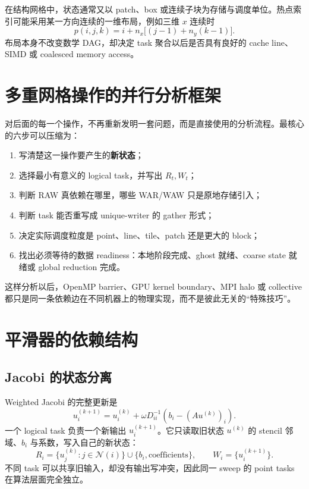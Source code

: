 在结构网格中，状态通常又以 patch、box 或连续子块为存储与调度单位。热点索引可能采用某一方向连续的一维布局，例如三维 $x$ 连续时
\begin{equation}
p(i,j,k)=i+n_x\bigl[(j-1)+n_y(k-1)\bigr].
\end{equation}
布局本身不改变数学 DAG，却决定 task 聚合以后是否具有良好的 cache line、SIMD 或 coalesced memory access。

\section{多重网格操作的并行分析框架}

对后面的每一个操作，不再重新发明一套问题，而是直接使用的分析流程。最核心的六步可以压缩为：

\begin{enumerate}
\item 写清楚这一操作要产生的\textbf{新状态}；
\item 选择最小有意义的 logical task，并写出 $R_t,W_t$；
\item 判断 RAW 真依赖在哪里，哪些 WAR/WAW 只是原地存储引入；
\item 判断 task 能否重写成 unique-writer 的 gather 形式；
\item 决定实际调度粒度是 point、line、tile、patch 还是更大的 block；
\item 找出必须等待的数据 readiness：本地阶段完成、ghost 就绪、coarse state 就绪或 global reduction 完成。
\end{enumerate}

这样分析以后，OpenMP barrier、GPU kernel boundary、MPI halo 或 collective 都只是同一条依赖边在不同机器上的物理实现，而不是彼此无关的“特殊技巧”。

\section{平滑器的依赖结构}

\subsection{Jacobi 的状态分离}

Weighted Jacobi 的完整更新是
\begin{equation}
u_i^{(k+1)}
=
u_i^{(k)}
+
\omega D_{ii}^{-1}
\left(
b_i-(Au^{(k)})_i
\right).
\label{eq:mg-parallel-jacobi-full}
\end{equation}
一个 logical task 负责一个新输出 $u_i^{(k+1)}$。它只读取旧状态 $u^{(k)}$ 的 stencil 邻域、$b_i$ 与系数，写入自己的新状态：
\begin{equation}
R_i=
\{u_j^{(k)}:j\in\mathcal N(i)\}
\cup
\{b_i,\text{coefficients}\},
\qquad
W_i=\{u_i^{(k+1)}\}.
\label{eq:mg-jacobi-rw}
\end{equation}
不同 task 可以共享旧输入，却没有输出写冲突，因此同一 sweep 的 point tasks 在算法层面完全独立。

